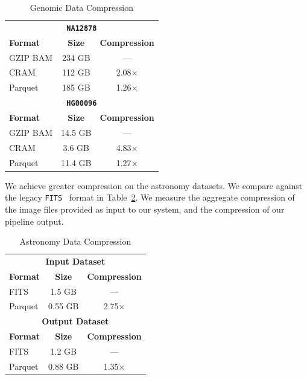 \documentclass{sig-alternate}
\begin{document}
\begin{table}[h]
\caption{Genomic Data Compression}
\label{tab:genomic-compression}
\begin{center}
\begin{tabular}{ l c c }
\hline
\multicolumn{3}{c}{\bf \texttt{NA12878}} \\
\bf Format & \bf Size & \bf Compression \\
\hline
\hline
GZIP BAM & 234 GB & --- \\
CRAM & 112 GB & 2.08$\times$ \\
Parquet & 185 GB & 1.26$\times$ \\
\hline
\multicolumn{3}{c}{\bf \texttt{HG00096}} \\
\bf Format & \bf Size & \bf Compression \\
\hline
\hline
GZIP BAM & 14.5 GB & --- \\
CRAM & 3.6 GB & 4.83$\times$ \\
Parquet & 11.4 GB & 1.27$\times$ \\
\hline
\end{tabular}
\end{center}
\end{table}

We achieve greater compression on the astronomy datasets. We compare against the legacy
\texttt{FITS}~\cite{wells81} format in Table~\ref{tab:astro-compression}. We measure the aggregate compression of the
image files provided as input to our system, and the compression of our pipeline output.

\begin{table}[h]
\caption{Astronomy Data Compression}
\label{tab:astro-compression}
\begin{center}
\begin{tabular}{ l c c }
\hline
\multicolumn{3}{c}{\bf Input Dataset} \\
\bf Format & \bf Size & \bf Compression \\
\hline
\hline
FITS & 1.5 GB & --- \\
Parquet & 0.55 GB & 2.75$\times$ \\
\hline
\multicolumn{3}{c}{\bf Output Dataset} \\
\bf Format & \bf Size & \bf Compression \\
\hline
\hline
FITS & 1.2 GB & --- \\
Parquet & 0.88 GB & 1.35$\times$ \\
\hline
\end{tabular}
\end{center}
\end{table}
\end{document}
